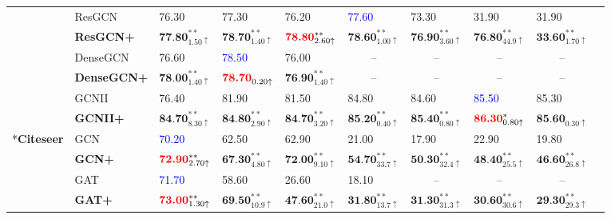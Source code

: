 \documentclass{article}
\begin{document}
\begin{table} [h!]
{\begin{tabular}{clllllllll}
     \cmidrule(r){2-9}
    & ResGCN  & 76.30  & 77.30& 76.20 &\textcolor{blue}{77.60} & 73.30&31.90&31.90\\
     &\textbf{ResGCN+}& $\textbf{77.80}_{1.50 \uparrow }^{**}$  & $\textbf{78.70}_{1.40 \uparrow }^{**}$& $\textbf{\textcolor{red}{78.80}}_{2.60 \uparrow }^{**}$ &$\textbf{78.60}_{1.00 \uparrow }^{**}$ & $\textbf{76.90}_{3.60 \uparrow }^{**}$&$\textbf{76.80}_{44.9 \uparrow }^{**}$&$\textbf{33.60}_{1.70 \uparrow }^{**}$\\
     \cmidrule(r){2-9}
    & DenseGCN & 76.60  & \textcolor{blue}{78.50}& 76.00 &\multicolumn{1}{c}{--} &\multicolumn{1}{c}{--} &\multicolumn{1}{c}{--}&\multicolumn{1}{c}{--}\\
    &\textbf{DenseGCN+}& $\textbf{78.00}_{1.40 \uparrow }^{**}$  & $\textbf{\textcolor{red}{78.70}}_{0.20 \uparrow }^{}$& $\textbf{76.90}_{1.40 \uparrow }^{**}$ &\multicolumn{1}{c}{--} & \multicolumn{1}{c}{--}&\multicolumn{1}{c}{--}&\multicolumn{1}{c}{--}\\
     \cmidrule(r){2-9}
    &GCNII & 76.40  & 81.90& 81.50 &84.80 &84.60 &\textcolor{blue}{85.50}&85.30\\
    &\textbf{GCNII+}&$\textbf{84.70}_{8.30 \uparrow }^{**}$ & $\textbf{84.80}_{2.90 \uparrow }^{**}$& $\textbf{84.70}_{3.20 \uparrow }^{**}$ &$\textbf{85.20}_{0.40 \uparrow }^{**}$ & $\textbf{85.40}_{0.80 \uparrow }^{**}$&$\textbf{\textcolor{red}{86.30}}_{0.80 \uparrow }^{*}$&$\textbf{85.60}_{0.30 \uparrow }^{}$\\
    \cmidrule(r){1-9}
    {\multirow{34}*{\textbf{Citeseer}} }  & GCN  &\textcolor{blue}{70.20}  &62.50 & 62.90 &21.00 & 17.90&22.90&19.80\\
    &\textbf{GCN+}& $\textbf{\textcolor{red}{72.90}}_{2.70 \uparrow }^{**}$  &$\textbf{67.30}_{4.80 \uparrow }^{**}$ &$\textbf{72.00}_{9.10 \uparrow }^{**}$  &$\textbf{54.70}_{33.7 \uparrow }^{**}$ & $\textbf{50.30}_{32.4 \uparrow }^{**}$&$\textbf{48.40}_{25.5 \uparrow }^{**}$&$\textbf{46.60}_{26.8 \uparrow }^{**}$\\
     \cmidrule(r){2-9}
     & GAT   & \textcolor{blue}{71.70}  & 58.60& 26.60 &18.10 & \multicolumn{1}{c}{--}&\multicolumn{1}{c}{--}&\multicolumn{1}{c}{--}\\
      &\textbf{GAT+}& $\textbf{\textcolor{red}{73.00}}_{1.30 \uparrow }^{**}$  & $\textbf{69.50}_{10.9 \uparrow }^{**}$& $\textbf{47.60}_{21.0 \uparrow }^{**}$ &$\textbf{31.80}_{13.7 \uparrow }^{**}$ & $\textbf{31.30}_{31.3 \uparrow }^{**}$&$\textbf{30.60}_{30.6 \uparrow }^{**}$&$\textbf{29.30}_{29.3 \uparrow }^{**}$\\

\end{tabular}}
\end{table}
\end{document}
